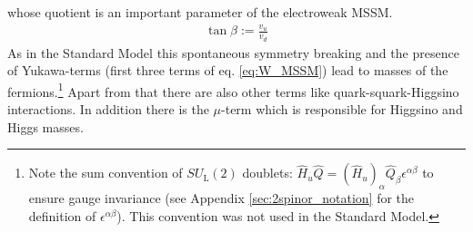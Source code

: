 whose quotient is an important parameter of the electroweak MSSM.
\begin{align}
\tan \beta := \frac{v_u}{v_d}
\end{align}
As in the Standard Model this spontaneous symmetry breaking and the presence of Yukawa-terms (first three terms of eq. \eqref{eq:W_MSSM}) lead to masses of the fermions.\footnote{Note the sum convention of $SU_{\mathrm{L}}(2)$ doublets: $\hat{H}_u \hat{Q} =  (\hat{H}_u)_{\alpha}\hat{Q}_\beta \epsilon^{\alpha\beta}$ to ensure gauge invariance (see Appendix \ref{sec:2spinor_notation} for the definition of $\epsilon^{\alpha\beta}$). This convention was not used in the Standard Model.} Apart from that there are also other terms like quark-squark-Higgsino interactions. In addition there is the $\mu$-term which is responsible for Higgsino and Higgs masses.\\


